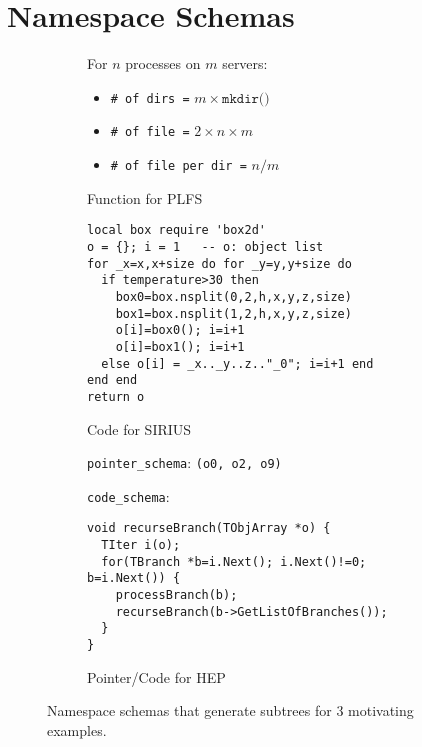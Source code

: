\section{Namespace Schemas}

\begin{figure*}[tbh]
  \centering
  \begin{subfigure}[b]{.3\linewidth}
    \centering
    For \(n\) processes on \(m\) servers:
    \begin{itemize}
      \item[] \texttt{\# of dirs =} \(m \times \texttt{mkdir()}\)
      \item[] \texttt{\# of file =} \(2 \times n \times m\)
      \item[] \texttt{\# of file per dir =} \(n/m\)
    \end{itemize}
    \caption{Function for PLFS} \label{fig:plfs}
  \end{subfigure}
  \begin{subfigure}[b]{.3\linewidth}
      \footnotesize
      \begin{verbatim}
local box require 'box2d'
o = {}; i = 1   -- o: object list
for _x=x,x+size do for _y=y,y+size do 
  if temperature>30 then
    box0=box.nsplit(0,2,h,x,y,z,size)
    box1=box.nsplit(1,2,h,x,y,z,size)
    o[i]=box0(); i=i+1
    o[i]=box1(); i=i+1
  else o[i] = _x.._y..z.."_0"; i=i+1 end
end end
return o
      \end{verbatim}
      \caption{Code for SIRIUS} \label{fig:sirius}
  \end{subfigure}
  \begin{subfigure}[b]{.3\linewidth}
\noindent\texttt{pointer\_schema}: \texttt{(o0, o2, o9)}

\noindent\texttt{code\_schema}:

      \centering
      \footnotesize
      \begin{verbatim}
void recurseBranch(TObjArray *o) {
  TIter i(o); 
  for(TBranch *b=i.Next(); i.Next()!=0; b=i.Next()) {
    processBranch(b);
    recurseBranch(b->GetListOfBranches());
  }
}
      \end{verbatim}
      \caption{Pointer/Code for HEP} \label{fig:hep}
  \end{subfigure}
\caption{Namespace schemas that generate subtrees for 3 motivating examples.\label{fig:use-cases}}
\end{figure*}


